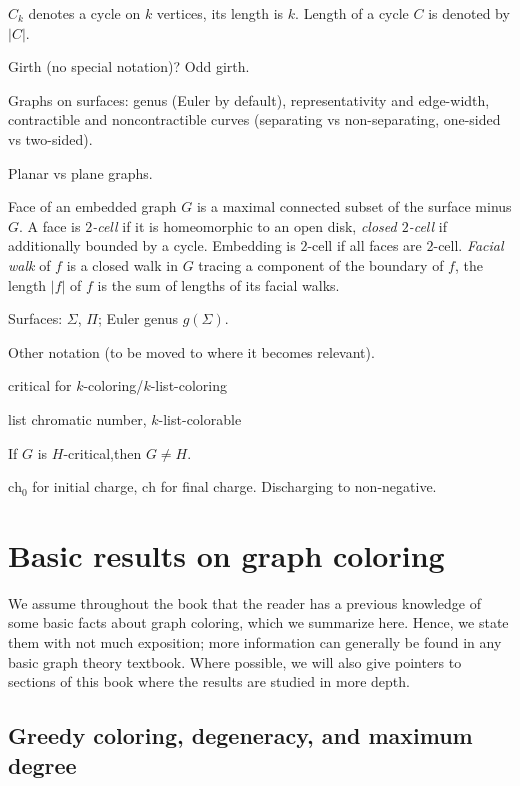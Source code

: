 \documentclass[12pt,twoside,openright,a4paper]{book}
\newcommand{\initch}{\text{ch}_0}
\newcommand{\finch}{\text{ch}}
\begin{document}
$C_k$ denotes a cycle on $k$ vertices, its length is $k$.  Length of a cycle $C$ is denoted by $|C|$.

Girth (no special notation)? Odd girth.

Graphs on surfaces: genus (Euler by default), representativity and edge-width, contractible and
noncontractible curves (separating vs non-separating, one-sided vs two-sided).

Planar vs plane graphs.

Face of an embedded graph $G$ is a maximal connected subset of the surface minus $G$.
A face is \emph{$2$-cell} if it is homeomorphic to an open disk, \emph{closed $2$-cell}
if additionally bounded by a cycle.  Embedding is $2$-cell if all faces are $2$-cell.
\emph{Facial walk} of $f$ is a closed walk in $G$ tracing
a component of the boundary of $f$, the length $|f|$ of $f$ is the sum of lengths of its facial
walks.

Surfaces: $\Sigma$, $\Pi$; Euler genus $g(\Sigma)$.

Other notation (to be moved to where it becomes relevant).

critical for $k$-coloring/$k$-list-coloring

list chromatic number, $k$-list-colorable

If $G$ is $H$-critical,then $G\neq H$.

$\initch$ for initial charge, $\finch$ for final charge.  Discharging to non-negative.

\section{Basic results on graph coloring}

We assume throughout the book that the reader has a previous knowledge of some basic facts
about graph coloring, which we summarize here.  Hence, we state them with not much exposition;
more information can generally be found in any basic graph theory textbook.
Where possible, we will also give pointers to sections of this book where the results are
studied in more depth.

\subsection{Greedy coloring, degeneracy, and maximum degree}
\end{document}
